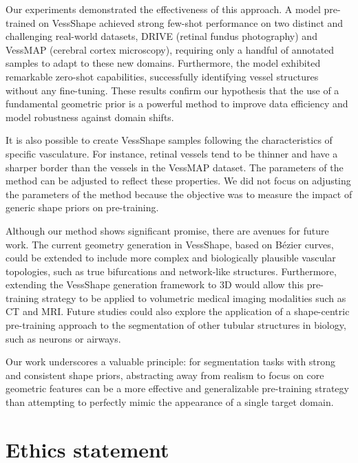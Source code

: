 \documentclass[%
reprint,
nofootinbib,
 amsmath,amssymb,
aps,
superscriptaddress,
showkeys,
longbibliography
]{revtex4-1}
\begin{document}
Our experiments demonstrated the effectiveness of this approach. A model pre-trained on VessShape achieved strong few-shot performance on two distinct and challenging real-world datasets, DRIVE (retinal fundus photography) and VessMAP (cerebral cortex microscopy), requiring only a handful of annotated samples to adapt to these new domains. Furthermore, the model exhibited remarkable zero-shot capabilities, successfully identifying vessel structures without any fine-tuning. These results confirm our hypothesis that the use of a fundamental geometric prior is a powerful method to improve data efficiency and model robustness against domain shifts.

It is also possible to create VessShape samples following the characteristics of specific vasculature. For instance, retinal vessels tend to be thinner and have a sharper border than the vessels in the VessMAP dataset. The parameters of the method can be adjusted to reflect these properties. We did not focus on adjusting the parameters of the method because the objective was to measure the impact of generic shape priors on pre-training.

Although our method shows significant promise, there are avenues for future work. The current geometry generation in VessShape, based on Bézier curves, could be extended to include more complex and biologically plausible vascular topologies, such as true bifurcations and network-like structures. Furthermore, extending the VessShape generation framework to 3D would allow this pre-training strategy to be applied to volumetric medical imaging modalities such as CT and MRI. Future studies could also explore the application of a shape-centric pre-training approach to the segmentation of other tubular structures in biology, such as neurons or airways.

Our work underscores a valuable principle: for segmentation tasks with strong and consistent shape priors, abstracting away from realism to focus on core geometric features can be a more effective and generalizable pre-training strategy than attempting to perfectly mimic the appearance of a single target domain.



\section*{Ethics statement}
\end{document}
